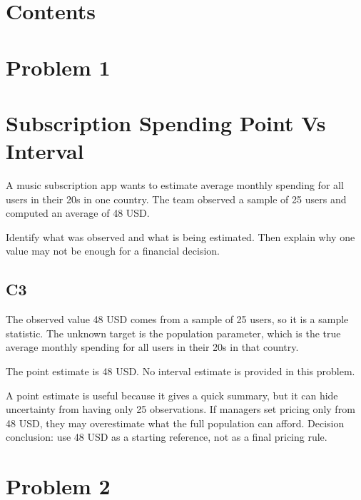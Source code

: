 


\section*{Contents}
\setcounter{tocdepth}{2}
\setcounter{secnumdepth}{1}
\tableofcontents


	\begin{ExamProblems}
		\item
		\section{Problem 1}
		\section{Subscription Spending Point Vs Interval}
		A music subscription app wants to estimate average monthly spending for all users in their 20s in one country.
		The team observed a sample of 25 users and computed an average of 48 USD.

		Identify what was observed and what is being estimated.
		Then explain why one value may not be enough for a financial decision.

		\subsection*{C3}
		The observed value 48 USD comes from a sample of 25 users, so it is a sample statistic.
		The unknown target is the population parameter, which is the true average monthly spending for all users in their 20s in that country.

		The point estimate is 48 USD.
		No interval estimate is provided in this problem.

		A point estimate is useful because it gives a quick summary, but it can hide uncertainty from having only 25 observations.
		If managers set pricing only from 48 USD, they may overestimate what the full population can afford.
		Decision conclusion: use 48 USD as a starting reference, not as a final pricing rule.

		\newpage
		\item
		\section{Problem 2}

\end{ExamProblems}
